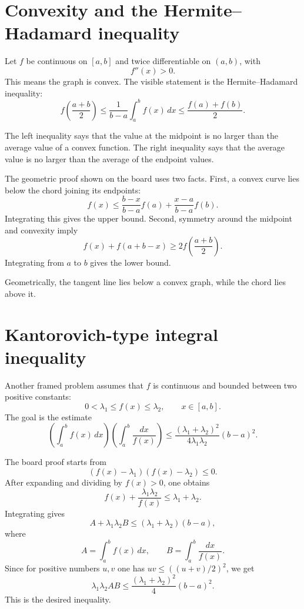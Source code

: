 


\section{Convexity and the Hermite--Hadamard inequality}

Let $f$ be continuous on $[a,b]$ and twice differentiable on $(a,b)$, with
\[
  f''(x)>0.
\]
This means the graph is convex.  The visible statement is the Hermite--Hadamard inequality:
\[
  f\left(
\frac{a+b}{2}
\right)
  \le
\frac1{b-a}\int_a^b f(x)\,dx
  \le
\frac{f(a)+f(b)}2.
\]

The left inequality says that the value at the midpoint is no larger than the average value of a convex function.  The right inequality says that the average value is no larger than the average of the endpoint values.

The geometric proof shown on the board uses two facts.  First, a convex curve lies below the chord joining its endpoints:
\[
  f(x)\le
\frac{b-x}{b-a}f(a)+
\frac{x-a}{b-a}f(b).
\]
Integrating this gives the upper bound.  Second, symmetry around the midpoint and convexity imply
\[
  f(x)+f(a+b-x)\ge 2f\left(
\frac{a+b}{2}
\right).
\]
Integrating from $a$ to $b$ gives the lower bound.

Geometrically, the tangent line lies below a convex graph, while the chord lies above it.

\section{Kantorovich-type integral inequality}

Another framed problem assumes that $f$ is continuous and bounded between two positive constants:
\[
  0<\lambda_1\le f(x)\le \lambda_2,\qquad x\in[a,b].
\]
The goal is the estimate
\[
  \left(\int_a^b f(x)\,dx
\right)
  \left(\int_a^b 
\frac{dx}{f(x)}
\right)
  \le
\frac{(\lambda_1+\lambda_2)^2}{4\lambda_1\lambda_2}(b-a)^2.
\]

The board proof starts from
\[
  (f(x)-\lambda_1)(f(x)-\lambda_2)\le0.
\]
After expanding and dividing by $f(x)>0$, one obtains
\[
  f(x)+
\frac{\lambda_1\lambda_2}{f(x)}
  \le \lambda_1+\lambda_2.
\]
Integrating gives
\[
  A+\lambda_1\lambda_2 B
  \le
  (\lambda_1+\lambda_2)(b-a),
\]
where
\[
  A=\int_a^b f(x)\,dx,\qquad
  B=\int_a^b
\frac{dx}{f(x)}.
\]
Since for positive numbers $u,v$ one has $uv\le ((u+v)/2)^2$, we get
\[
  \lambda_1\lambda_2 AB
  \le
\frac{(\lambda_1+\lambda_2)^2}{4}(b-a)^2.
\]
This is the desired inequality.

